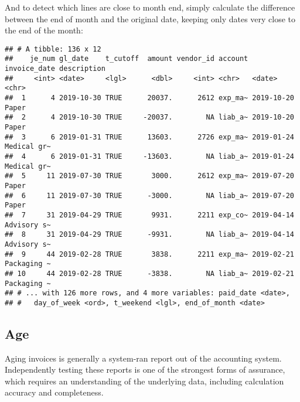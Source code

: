 \documentclass[
]{book}
\newenvironment{Shaded}{\begin{snugshade}}{\end{snugshade}}
\newcommand{\CommentTok}[1]{\textcolor[rgb]{0.56,0.35,0.01}{\textit{#1}}}
\newcommand{\DataTypeTok}[1]{\textcolor[rgb]{0.13,0.29,0.53}{#1}}
\newcommand{\DecValTok}[1]{\textcolor[rgb]{0.00,0.00,0.81}{#1}}
\newcommand{\KeywordTok}[1]{\textcolor[rgb]{0.13,0.29,0.53}{\textbf{#1}}}
\newcommand{\NormalTok}[1]{#1}
\newcommand{\OperatorTok}[1]{\textcolor[rgb]{0.81,0.36,0.00}{\textbf{#1}}}
\newcommand{\StringTok}[1]{\textcolor[rgb]{0.31,0.60,0.02}{#1}}
\begin{document}
And to detect which lines are close to month end, simply calculate the difference between the end of month and the original date, keeping only dates very close to the end of the month:

\begin{Shaded}
\end{Shaded}

\begin{verbatim}
## # A tibble: 136 x 12
##    je_num gl_date    t_cutoff  amount vendor_id account invoice_date description
##     <int> <date>     <lgl>      <dbl>     <int> <chr>   <date>       <chr>      
##  1      4 2019-10-30 TRUE      20037.      2612 exp_ma~ 2019-10-20   Paper      
##  2      4 2019-10-30 TRUE     -20037.        NA liab_a~ 2019-10-20   Paper      
##  3      6 2019-01-31 TRUE      13603.      2726 exp_ma~ 2019-01-24   Medical gr~
##  4      6 2019-01-31 TRUE     -13603.        NA liab_a~ 2019-01-24   Medical gr~
##  5     11 2019-07-30 TRUE       3000.      2612 exp_ma~ 2019-07-20   Paper      
##  6     11 2019-07-30 TRUE      -3000.        NA liab_a~ 2019-07-20   Paper      
##  7     31 2019-04-29 TRUE       9931.      2211 exp_co~ 2019-04-14   Advisory s~
##  8     31 2019-04-29 TRUE      -9931.        NA liab_a~ 2019-04-14   Advisory s~
##  9     44 2019-02-28 TRUE       3838.      2211 exp_ma~ 2019-02-21   Packaging ~
## 10     44 2019-02-28 TRUE      -3838.        NA liab_a~ 2019-02-21   Packaging ~
## # ... with 126 more rows, and 4 more variables: paid_date <date>,
## #   day_of_week <ord>, t_weekend <lgl>, end_of_month <date>
\end{verbatim}

\hypertarget{age}{%
\subsection{Age}\label{age}}

Aging invoices is generally a system-ran report out of the accounting system. Independently testing these reports is one of the strongest forms of assurance, which requires an understanding of the underlying data, including calculation accuracy and completeness.
\end{document}

